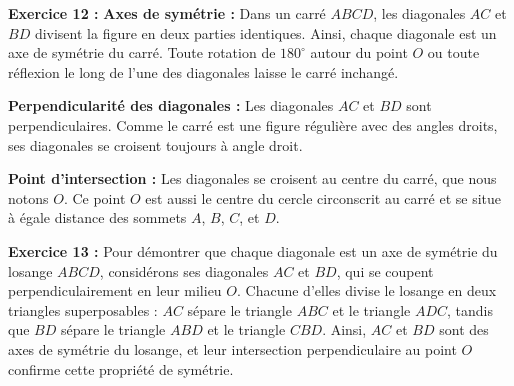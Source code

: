 \documentclass{article}
\begin{document}
\begin{tcolorbox}[colback=green!10!white, colframe=green!75!black, title=\textcolor{white}{Corrections des Exercices avec Graphiques}, sharp corners=south]

        \textbf{Exercice 12 :} \textbf{Axes de symétrie :} Dans un carré \(ABCD\), les diagonales \( AC \) et \( BD \) divisent la figure en deux parties identiques. Ainsi, chaque diagonale est un axe de symétrie du carré. Toute rotation de \( 180^\circ \) autour du point \( O \) ou toute réflexion le long de l’une des diagonales laisse le carré inchangé.

        \vspace{0.2cm}

       \textbf{Perpendicularité des diagonales :} Les diagonales \( AC \) et \( BD \) sont perpendiculaires. Comme le carré est une figure régulière avec des angles droits, ses diagonales se croisent toujours à angle droit.


\begin{center}
\end{center}

\textbf{Point d'intersection :} Les diagonales se croisent au centre du carré, que nous notons \( O \). Ce point \( O \) est aussi le centre du cercle circonscrit au carré et se situe à égale distance des sommets \( A \), \( B \), \( C \), et \( D \).

\vspace{0.3cm}

        \textbf{Exercice 13 :} Pour démontrer que chaque diagonale est un axe de symétrie du losange \( ABCD \), considérons ses diagonales \( AC \) et \( BD \), qui se coupent perpendiculairement en leur milieu \( O \). Chacune d'elles divise le losange en deux triangles superposables : \( AC \) sépare le triangle \( ABC \) et le triangle \( ADC \), tandis que \( BD \) sépare le triangle \( ABD \) et le triangle \( CBD \). Ainsi, \( AC \) et \( BD \) sont des axes de symétrie du losange, et leur intersection perpendiculaire au point \( O \) confirme cette propriété de symétrie.


\end{tcolorbox}
\end{document}
